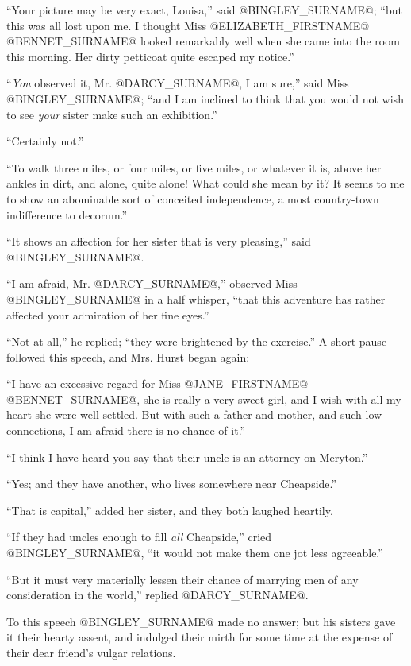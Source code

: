 ``Your picture may be very exact, Louisa,'' said @BINGLEY_SURNAME@; ``but this was
all lost upon me. I thought Miss @ELIZABETH_FIRSTNAME@ @BENNET_SURNAME@ looked remarkably
well when she came into the room this morning. Her dirty petticoat quite
escaped my notice.''

``\textit{You} observed it, Mr. @DARCY_SURNAME@, I am sure,'' said Miss @BINGLEY_SURNAME@; ``and I am
inclined to think that you would not wish to see \textit{your} sister make such
an exhibition.''

``Certainly not.''

``To walk three miles, or four miles, or five miles, or whatever it is,
above her ankles in dirt, and alone, quite alone! What could she mean by
it? It seems to me to show an abominable sort of conceited independence,
a most country-town indifference to decorum.''

``It shows an affection for her sister that is very pleasing,'' said
@BINGLEY_SURNAME@.

``I am afraid, Mr. @DARCY_SURNAME@,'' observed Miss @BINGLEY_SURNAME@ in a half whisper, ``that
this adventure has rather affected your admiration of her fine eyes.''

``Not at all,'' he replied; ``they were brightened by the exercise.'' A
short pause followed this speech, and Mrs. Hurst began again:

``I have an excessive regard for Miss @JANE_FIRSTNAME@ @BENNET_SURNAME@, she is really a very
sweet girl, and I wish with all my heart she were well settled. But with
such a father and mother, and such low connections, I am afraid there is
no chance of it.''

``I think I have heard you say that their uncle is an attorney on
Meryton.''

``Yes; and they have another, who lives somewhere near Cheapside.''

``That is capital,'' added her sister, and they both laughed heartily.

``If they had uncles enough to fill \textit{all} Cheapside,'' cried @BINGLEY_SURNAME@, ``it
would not make them one jot less agreeable.''

``But it must very materially lessen their chance of marrying men of any
consideration in the world,'' replied @DARCY_SURNAME@.

To this speech @BINGLEY_SURNAME@ made no answer; but his sisters gave it their
hearty assent, and indulged their mirth for some time at the expense of
their dear friend's vulgar relations.

